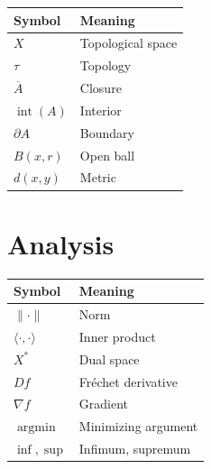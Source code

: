 \documentclass[11pt]{book}
\numberwithin{equation}{chapter}
\theoremstyle{definition}
\theoremstyle{plain}
\begin{document}
\begin{center}

\begin{tabular}{ll}

Symbol & Meaning
\\
\hline

$X$ &
Topological space
\\

$\tau$ &
Topology
\\

$\overline A$ &
Closure
\\

$\operatorname{int}(A)$ &
Interior
\\

$\partial A$ &
Boundary
\\

$B(x,r)$ &
Open ball
\\

$d(x,y)$ &
Metric

\end{tabular}

\end{center}


\section{Analysis}

\begin{center}

\begin{tabular}{ll}

Symbol & Meaning
\\
\hline

$\|\cdot\|$ &
Norm
\\

$\langle\cdot,\cdot\rangle$ &
Inner product
\\

$X^*$ &
Dual space
\\

$Df$ &
Fréchet derivative
\\

$\nabla f$ &
Gradient
\\

$\operatorname{argmin}$ &
Minimizing argument
\\

$\inf,\sup$ &
Infimum, supremum

\end{tabular}

\end{center}
\end{document}
